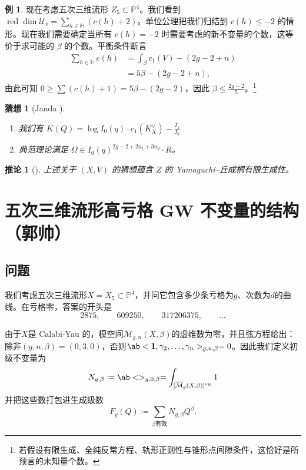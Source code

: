\documentclass{amsart}
\newtheorem{cor}[thm]{推论}
\newtheorem{conj}[thm]{猜想}
\theoremstyle{definition}
\newtheorem{exm}[thm]{例}
\theoremstyle{remark}
\theoremstyle{plain}
\theoremstyle{definition}
\theoremstyle{remark}
\renewcommand{\H}{\mathbb{H}}
\renewcommand{\P}{\mathbb{P}}
\newcommand{\Mbar}{\overline{\mathcal{M}}}
\newcommand{\mc}[1]{\mathcal{#1}}
\newcommand{\mr}[1]{\mathrm{#1}}
\newcommand{\on}[1]{\operatorname{#1}}
\newcommand{\1}{\mathbf{1}}
\newcommand{\2}{\mathbf{2}}
\newcommand{\3}{\mathbf{3}}
\newcommand{\vir}{\mr{vir}}
\begin{document}
\begin{exm}
    现在考虑五次三维流形 \(Z_5 \subset \P^4\)。我们看到 \(\on{red}\dim \mc{U}_v = \sum_{h \in \H} (c(h)+2)\)。单位公理把我们归结到 \(c(h) \leq -2\) 的情形。现在我们需要确定当所有 \(c(h) = -2\) 时需要考虑的新不变量的个数，这等价于求可能的 \(\beta\) 的个数。平衡条件断言
    \begin{align*}
        \sum_{h \in \H} c(h) &= \int_{\beta} c_1(V) - (2g-2+n) \\
        &= 5\beta - (2g-2+n),
    \end{align*}
    由此可知 \(0 \geq \sum (c(h)+1) = 5\beta - (2g-2)\)，因此 \(\beta \leq \frac{2g-2}{5}\)。\footnote{若假设有限生成、全纯反常方程、轨形正则性与锥形点间隙条件，这恰好是所预言的未知量个数。}
\end{exm}

\begin{conj}[Janda {\cite[猜想~1.6]{CJRtropical2025}}]\leavevmode
    \begin{enumerate}
        \item 我们有 \(K(Q) = \log I_0(q) \cdot c_1(K_X^{\vee}) - \frac{I_1}{I_0}\) \\
        \item 典范理论满足 \(\Omega \in I_0(q)^{2g-2+2n_1 + 3 n_2} \cdot R\)。
    \end{enumerate}
\end{conj}

\begin{cor}[{\cite[定理~1.7]{CJRtropical2025}}]
    上述关于 \((X, V)\) 的猜想蕴含 \(Z\) 的 Yamaguchi–丘成桐有限生成性。
\end{cor}


\section{五次三维流形高亏格 GW 不变量的结构（郭帅）}%
\label{sec:Structure of higher-genus GW invariants of the quintic (Shuai Guo)}

\subsection{问题}%
\label{sub:The problem (Guo)}

我们考虑五次三维流形\(X = X_5 \subset \P^4\)，并问它包含多少条亏格为\(g\)、次数为\(d\)的曲线。在亏格零，答案的开头是
\[ 2875, \qquad 609250, \qquad 317206375, \qquad \ldots \]

由于\(X\)是 Calabi-Yau 的，模空间\(\Mbar_{g,n}(X,\beta)\)的虚维数为零，并且弦方程给出：除非\((g,n,\beta) = (0,3,0)\)，否则\(\ab<\1, \gamma_2, \ldots, \gamma_n>_{g,n,\beta} = 0\)。因此我们定义初级不变量为
\[ N_{g,\beta} \coloneqq \ab<>_{g,0,\beta} = \int_{[\Mbar_g(X,\beta)]^{\vir}} 1 \]
并把这些数打包进生成级数
\[ F_g(Q) \coloneqq \sum_{\beta \text{有效}} N_{g,\beta}Q^{\beta}. \]
\end{document}

